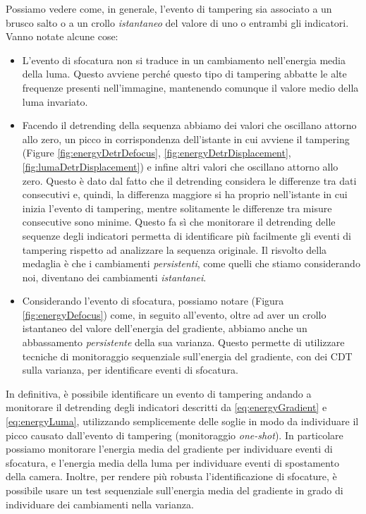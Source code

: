 \noindent Possiamo vedere come, in generale, l'evento di tampering sia associato a un brusco salto o a un crollo \textit{istantaneo} del valore di uno o entrambi gli indicatori.
Vanno notate alcune cose:
\begin{itemize}
	\item L'evento di sfocatura non si traduce in un cambiamento nell'energia media della luma.
	Questo avviene perch\'e questo tipo di tampering abbatte le alte frequenze presenti nell'immagine, mantenendo comunque il valore medio della luma invariato.
	\item Facendo il detrending della sequenza abbiamo dei valori che oscillano attorno allo zero, un picco in corrispondenza dell'istante in cui avviene il tampering (Figure \ref{fig:energyDetrDefocus}, \ref{fig:energyDetrDisplacement}, \ref{fig:lumaDetrDisplacement}) e infine altri valori che oscillano attorno allo zero.
	Questo \`e dato dal fatto che il detrending considera le differenze tra dati consecutivi e, quindi, la differenza maggiore si ha proprio nell'istante in cui inizia l'evento di tampering, mentre solitamente le differenze tra misure consecutive sono minime. 
	Questo fa s\`i che monitorare il detrending delle sequenze degli indicatori permetta di identificare pi\`u facilmente gli eventi di tampering rispetto ad analizzare la sequenza originale.
	Il risvolto della medaglia \`e che i cambiamenti \textit{persistenti}, come quelli che stiamo considerando noi, diventano dei cambiamenti \textit{istantanei}.
	\item Considerando l'evento di sfocatura, possiamo notare (Figura \ref{fig:energyDefocus}) come, in seguito all'evento, oltre ad aver un crollo istantaneo del valore dell'energia del gradiente, abbiamo anche un abbassamento \textit{persistente} della sua varianza.
	Questo permette di utilizzare tecniche di monitoraggio sequenziale sull'energia del gradiente, con dei CDT sulla varianza, per identificare eventi di sfocatura.
\end{itemize}
In definitiva, \`e possibile identificare un evento di tampering andando a monitorare il detrending degli indicatori descritti da \eqref{eq:energyGradient} e \eqref{eq:energyLuma}, utilizzando semplicemente delle soglie in modo da individuare il picco causato dall'evento di tampering (monitoraggio \textit{one-shot}).
In particolare possiamo monitorare l'energia media del gradiente per individuare eventi di sfocatura, e l'energia media della luma per individuare eventi di spostamento della camera.
Inoltre, per rendere pi\`u robusta l'identificazione di sfocature, \`e possibile usare un test sequenziale sull'energia media del gradiente in grado di individuare dei cambiamenti nella varianza.
